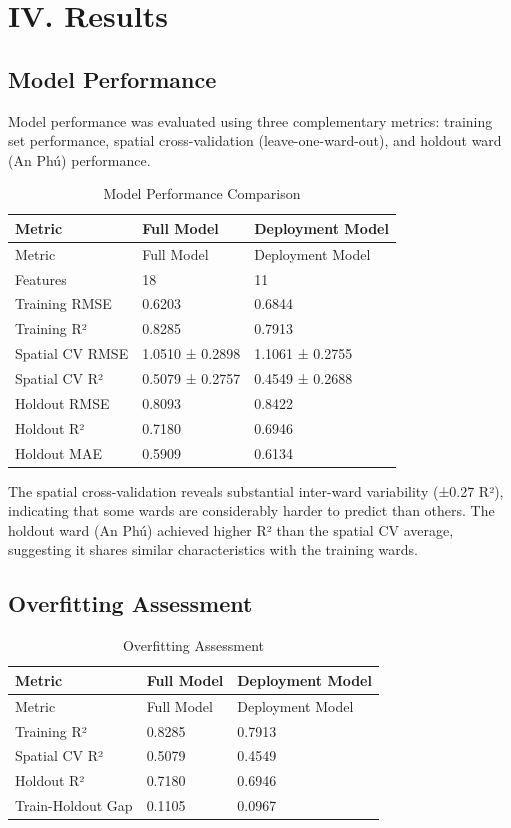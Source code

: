 \documentclass[
]{report}
\begin{document}
\chapter{IV. Results}\label{iv.-results}

\section{Model Performance}\label{model-performance}

Model performance was evaluated using three complementary metrics:
training set performance, spatial cross-validation (leave-one-ward-out),
and holdout ward (An Phú) performance.

\begin{longtable}[]{@{}lll@{}}
\caption{Model Performance Comparison}\tabularnewline
\toprule\noalign{}
Metric & Full Model & Deployment Model \\
\midrule\noalign{}
\endfirsthead
\toprule\noalign{}
Metric & Full Model & Deployment Model \\
\midrule\noalign{}
\endhead
\bottomrule\noalign{}
\endlastfoot
Features & 18 & 11 \\
Training RMSE & 0.6203 & 0.6844 \\
Training R² & 0.8285 & 0.7913 \\
Spatial CV RMSE & 1.0510 ± 0.2898 & 1.1061 ± 0.2755 \\
Spatial CV R² & 0.5079 ± 0.2757 & 0.4549 ± 0.2688 \\
Holdout RMSE & 0.8093 & 0.8422 \\
Holdout R² & 0.7180 & 0.6946 \\
Holdout MAE & 0.5909 & 0.6134 \\
\end{longtable}

The spatial cross-validation reveals substantial inter-ward variability
(±0.27 R²), indicating that some wards are considerably harder to
predict than others. The holdout ward (An Phú) achieved higher R² than
the spatial CV average, suggesting it shares similar characteristics
with the training wards.

\section{Overfitting Assessment}\label{overfitting-assessment}

\begin{longtable}[]{@{}lll@{}}
\caption{Overfitting Assessment}\tabularnewline
\toprule\noalign{}
Metric & Full Model & Deployment Model \\
\midrule\noalign{}
\endfirsthead
\toprule\noalign{}
Metric & Full Model & Deployment Model \\
\midrule\noalign{}
\endhead
\bottomrule\noalign{}
\endlastfoot
Training R² & 0.8285 & 0.7913 \\
Spatial CV R² & 0.5079 & 0.4549 \\
Holdout R² & 0.7180 & 0.6946 \\
Train-Holdout Gap & 0.1105 & 0.0967 \\
\end{longtable}
\end{document}
